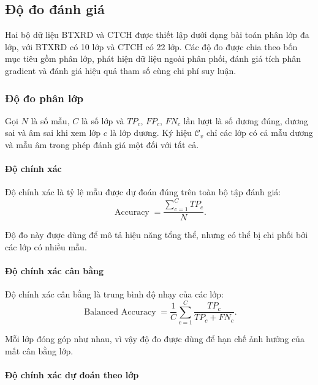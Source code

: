 \subsection{Độ đo đánh giá}
\label{sec:evaluation_metrics}
Hai bộ dữ liệu BTXRD và CTCH được thiết lập dưới dạng bài toán phân lớp đa lớp, với BTXRD có 10 lớp và CTCH có 22 lớp. Các độ đo được chia theo bốn mục tiêu gồm phân lớp, phát hiện dữ liệu ngoài phân phối, đánh giá tích phân gradient và đánh giá hiệu quả tham số cùng chi phí suy luận.

\subsubsection{Độ đo phân lớp}

Gọi $N$ là số mẫu, $C$ là số lớp và $TP_c$, $FP_c$, $FN_c$ lần lượt là số dương đúng, dương sai và âm sai khi xem lớp $c$ là lớp dương. Ký hiệu $\mathcal{C}_v$ chỉ các lớp có cả mẫu dương và mẫu âm trong phép đánh giá một đối với tất cả.

\paragraph{Độ chính xác}

Độ chính xác là tỷ lệ mẫu được dự đoán đúng trên toàn bộ tập đánh giá:
\begin{equation}
\operatorname{Accuracy}=\frac{\sum_{c=1}^{C}TP_c}{N}.
\label{eq:ch4_accuracy}
\end{equation}

Độ đo này được dùng để mô tả hiệu năng tổng thể, nhưng có thể bị chi phối bởi các lớp có nhiều mẫu.

\paragraph{Độ chính xác cân bằng}

Độ chính xác cân bằng \cite{Brodersen2010BalancedAcc} là trung bình độ nhạy của các lớp:
\begin{equation}
\operatorname{Balanced\ Accuracy}
=\frac{1}{C}\sum_{c=1}^{C}\frac{TP_c}{TP_c+FN_c}.
\label{eq:ch4_balanced_accuracy}
\end{equation}

Mỗi lớp đóng góp như nhau, vì vậy độ đo được dùng để hạn chế ảnh hưởng của mất cân bằng lớp.

\paragraph{Độ chính xác dự đoán theo lớp}

